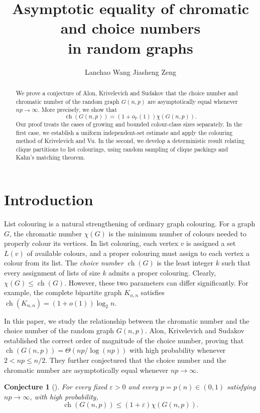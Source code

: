 \documentclass[11pt]{article}
\title{Asymptotic equality of chromatic and choice numbers \\ in random graphs}
\author{Lanchao Wang \qquad Jiasheng Zeng}
\date{}
\newtheorem{conjecture}[theorem]{Conjecture}
\numberwithin{equation}{section}
\newcommand{\ch}{\operatorname{ch}}
\newcommand{\op}{o_{\mathbb P}}
\begin{document}
\maketitle


\begin{abstract}
We prove a conjecture of Alon, Krivelevich and Sudakov
that the choice number and chromatic number of the random
graph $G(n,p)$ are asymptotically equal whenever
$np\to\infty$. More precisely, we show that
\[
 \ch(G(n,p))=(1+\op(1))\chi(G(n,p)).
\]
Our proof treats the cases of growing and bounded
colour-class sizes separately. In the first case, we
establish a uniform independent-set estimate and apply
the colouring method of Krivelevich and Vu. In the
second, we develop a deterministic result relating
clique partitions to list colourings, using random
sampling of clique packings and Kahn's matching theorem.
\end{abstract}


\section{Introduction}\label{sec:main}

List colouring is a natural strengthening of ordinary graph
colouring. For a graph $G$, the chromatic number $\chi(G)$ is
the minimum number of colours needed to properly colour its
vertices. In list colouring, each vertex $v$ is assigned a
set $L(v)$ of available colours, and a proper colouring must
assign to each vertex a colour from its list. The
\emph{choice number} $\ch(G)$ is the least integer $k$ such
that every assignment of lists of size $k$ admits a proper
colouring. Clearly, $\chi(G)\le\ch(G)$. However, these two parameters can differ significantly.
For example, the complete bipartite graph $K_{n,n}$ satisfies
$\ch(K_{n,n})=(1+o(1))\log_2 n$.



In this paper, we study the relationship between the
chromatic number and the choice number of the random
graph $G(n,p)$. Alon, Krivelevich and Sudakov~\cite{AKS}
established the correct order of magnitude of the choice
number, proving that
$\ch(G(n,p))=\Theta(np/\log(np))$
with high probability whenever $2<np\le n/2$.
They further conjectured that the choice number
and the chromatic number are asymptotically equal
whenever $np\to\infty$.

\begin{conjecture}[{\cite{AKS}}]
For every fixed $\varepsilon>0$ and every
$p=p(n)\in(0,1)$ satisfying $np\to\infty$,
with high probability,
\[
 \ch(G(n,p))\le(1+\varepsilon)\chi(G(n,p)).
\]
\end{conjecture}
\end{document}

